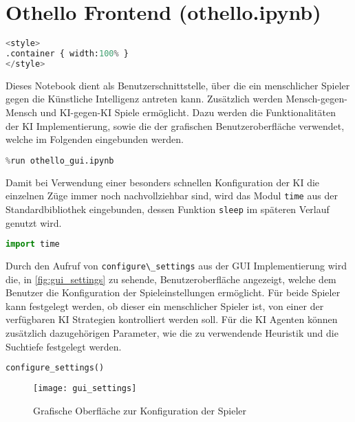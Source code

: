 \hypertarget{othello-frontend-othello.ipynb}{%
\section{Othello Frontend
(othello.ipynb)}\label{othello-frontend-othello.ipynb}}

\label{sec:frontend}

\begin{lstlisting}[language=Python]
%%HTML
<style>
.container { width:100% }
</style>
\end{lstlisting}

Dieses Notebook dient als Benutzerschnittstelle, über die ein
menschlicher Spieler gegen die Künstliche Intelligenz antreten kann.
Zusätzlich werden Mensch-gegen-Mensch und KI-gegen-KI Spiele ermöglicht.
Dazu werden die Funktionalitäten der KI Implementierung, sowie die der
grafischen Benutzeroberfläche verwendet, welche im Folgenden eingebunden
werden.

\begin{lstlisting}[language=Python]
%run othello_ai.ipynb
%run othello_gui.ipynb
\end{lstlisting}

Damit bei Verwendung einer besonders schnellen Konfiguration der KI die
einzelnen Züge immer noch nachvollziehbar sind, wird das Modul
\passthrough{\lstinline!time!} aus der Standardbibliothek eingebunden,
dessen Funktion \passthrough{\lstinline!sleep!} im späteren Verlauf
genutzt wird.

\begin{lstlisting}[language=Python]
import time
\end{lstlisting}

Durch den Aufruf von \passthrough{\lstinline!configure\_settings!} aus
der GUI Implementierung wird die, in \autoref{fig:gui_settings} zu
sehende, Benutzeroberfläche angezeigt, welche dem Benutzer die
Konfiguration der Spieleinstellungen ermöglicht. Für beide Spieler kann
festgelegt werden, ob dieser ein menschlicher Spieler ist, von einer der
verfügbaren KI Strategien kontrolliert werden soll. Für die KI Agenten
können zusätzlich dazugehörigen Parameter, wie die zu verwendende
Heuristik und die Suchtiefe festgelegt werden.

\begin{lstlisting}[language=Python]
configure_settings()
\end{lstlisting}

\begin{figure}[h]
    \centering
    \texttt{[image: gui\_settings]}
    \caption{Grafische Oberfläche zur Konfiguration der Spieler}
    \label{fig:gui_settings}
\end{figure}


